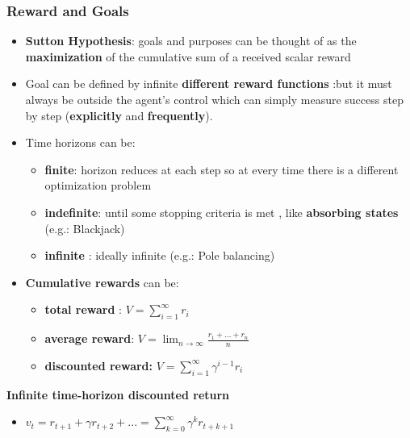 \documentclass[12pt]{article} %
\begin{document}
\subsubsection{Reward and Goals}
\begin{itemize}
\item \textbf{Sutton Hypothesis}: goals and purposes can be thought of as the \textbf{maximization} of the cumulative sum of a received scalar reward
\item Goal can be defined by infinite \textbf{different reward functions} :but it must always be outside the agent's control which can simply measure success step by step (\textbf{explicitly} and \textbf{frequently}).

\item Time horizons can be:
\begin{itemize}
\item \textbf{finite}: horizon reduces at each step so at every time there is a different optimization problem
\item \textbf{indefinite}: until some stopping criteria is met , like \textbf{absorbing states} (e.g.: Blackjack)
\item \textbf{infinite} : ideally infinite (e.g.: Pole balancing)
\end{itemize}

\item \textbf{Cumulative rewards} can be:
\begin{itemize}
\item \textbf{total reward} : $V = \sum \limits_{i=1}^{\infty}r_i$
\item \textbf{average reward}: $V= \lim_{n \to \infty}\frac{r_1+...+r_n}{n}$
\item \textbf{discounted reward:} $V= \sum_{i=1}^{\infty} \gamma^{i-1}r_i$ 
\end{itemize}
\end{itemize}

\textbf{Infinite time-horizon discounted return}
\begin{itemize}
\item $v_t = r_{t+1} + \gamma r_{t+2} + ... = \sum_{k=0}^{\infty} \gamma^k r_{t+k+1} $ 
\end{itemize}
\end{document}
